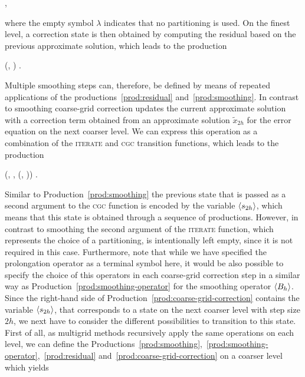 \begin{bnf}
	 {
		 \bnfor \bnfes
	},
\label{prod:partitioning}
\end{bnf}
where the empty symbol $\lambda$ indicates that no partitioning is used. On the finest level, a correction state is then obtained by computing the residual based on the previous approximate solution, which leads to the production
\begin{bnf}
	 {
		(, \bnfsp {}) 
	}.
\label{prod:residual}
\end{bnf}
Multiple smoothing steps can, therefore, be defined by means of repeated applications of the productions~\eqref{prod:residual} and~\eqref{prod:smoothing}.
In contrast to smoothing coarse-grid correction updates the current approximate solution with a correction term obtained from an approximate solution $\tilde{x}_{2h}$ for the error equation on the next coarser level.
We can express this operation as a combination of the \textsc{iterate} and \textsc{cgc} transition functions, which leads to the production
\begin{bnf}
	 {
		(\bnfts{$\omega$}, \bnfsp \bnfes, \bnfsp {}(, \bnfsp {}))
	}.
\label{prod:coarse-grid-correction}
\end{bnf}
Similar to Production~\eqref{prod:smoothing} the previous state that is passed as a second argument to the \textsc{cgc} function is encoded by the variable $\langle s_{2h} \rangle$, which means that this state is obtained through a sequence of productions.
However, in contrast to smoothing the second argument of the \textsc{iterate} function, which represents the choice of a partitioning, is intentionally left empty, since it is not required in this case.
Furthermore, note that while we have specified the prolongation operator as a terminal symbol here, it would be also possible to specify the choice of this operators in each coarse-grid correction step in a similar way as Production~\eqref{prod:smoothing-operator} for the smoothing operator $\langle B_h \rangle$.
Since the right-hand side of Production~\eqref{prod:coarse-grid-correction} contains the variable $\langle s_{2h} \rangle$, that corresponds to a state on the next coarser level with step size $2h$, we next have to consider the different possibilities to transition to this state.
First of all, as multigrid methods recursively apply the same operations on each level, we can define the Productions~\eqref{prod:smoothing},~\eqref{prod:smoothing-operator},~\eqref{prod:residual} and~\eqref{prod:coarse-grid-correction} on a coarser level which yields
